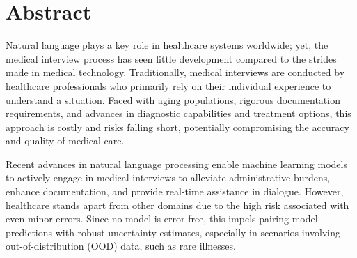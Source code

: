 
\chapter[abstract]{Abstract}

Natural language plays a key role in healthcare systems worldwide; yet, the medical interview process has seen little development compared to the strides made in medical technology. 
Traditionally, medical interviews are conducted by healthcare professionals who primarily rely on their individual experience to understand a situation. 
Faced with aging populations, rigorous documentation requirements, and advances in diagnostic capabilities and treatment options, this approach is costly and risks falling short, potentially compromising the accuracy and quality of medical care.

Recent advances in natural language processing enable machine learning models to actively engage in medical interviews to alleviate administrative burdens, enhance documentation, and provide real-time assistance in dialogue. 
However, healthcare stands apart from other domains due to the high risk associated with even minor errors. Since no model is error-free, this impels pairing model predictions with robust uncertainty estimates, especially in scenarios involving out-of-distribution (OOD) data, such as rare illnesses. 

